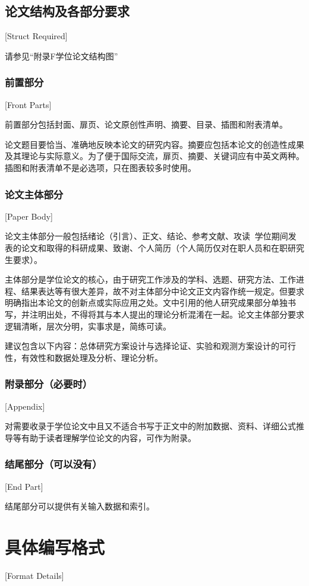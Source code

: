 \subsection{论文结构及各部分要求}[Struct Required]

请参见“附录F学位论文结构图”

\subsubsection{前置部分}[Front Parts]

前置部分包括封面、扉页、论文原创性声明、摘要、目录、插图和附表清单。

论文题目要恰当、准确地反映本论文的研究内容。摘要应包括本论文的创造性成果及其理论与实际意义。为了便于国际交流，扉页、摘要、关键词应有中英文两种。插图和附表清单不是必选项，只在图表较多时使用。

\subsubsection{论文主体部分}[Paper Body]

论文主体部分一般包括绪论（引言）、正文、结论、参考文献、攻读学位期间发表的论文和取得的科研成果、致谢、个人简历（个人简历仅对在职人员和在职研究生要求）。

主体部分是学位论文的核心，由于研究工作涉及的学科、选题、研究方法、工作进程、结果表达等有很大差异，故不对主体部分中论文正文内容作统一规定。但要求明确指出本论文的创新点或实际应用之处。文中引用的他人研究成果部分单独书写，并注明出处，不得将其与本人提出的理论分析混淆在一起。论文主体部分要求逻辑清晰，层次分明，实事求是，简练可读。

建议包含以下内容：总体研究方案设计与选择论证、实验和观测方案设计的可行性，有效性和数据处理及分析、理论分析。

\subsubsection{附录部分（必要时）}[Appendix]

对需要收录于学位论文中且又不适合书写于正文中的附加数据、资料、详细公式推导等有助于读者理解学位论文的内容，可作为附录。

\subsubsection{结尾部分（可以没有）}[End Part]

结尾部分可以提供有关输入数据和索引。

\section{具体编写格式}[Format Details]

